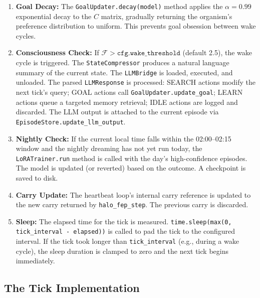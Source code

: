 \begin{enumerate}
    \item \textbf{Goal Decay:} The \texttt{GoalUpdater.decay(model)} method applies the $\alpha = 0.99$ exponential decay to the $C$ matrix, gradually returning the organism's preference distribution to uniform. This prevents goal obsession between wake cycles.

    \item \textbf{Consciousness Check:} If $\mathcal{F} > \texttt{cfg.wake\_threshold}$ (default 2.5), the wake cycle is triggered. The \texttt{StateCompressor} produces a natural language summary of the current state. The \texttt{LLMBridge} is loaded, executed, and unloaded. The parsed \texttt{LLMResponse} is processed: SEARCH actions modify the next tick's query; GOAL actions call \texttt{GoalUpdater.update\_goal}; LEARN actions queue a targeted memory retrieval; IDLE actions are logged and discarded. The LLM output is attached to the current episode via \texttt{EpisodeStore.update\_llm\_output}.

    \item \textbf{Nightly Check:} If the current local time falls within the 02:00--02:15 window and the nightly dreaming has not yet run today, the \texttt{LoRATrainer.run} method is called with the day's high-confidence episodes. The model is updated (or reverted) based on the outcome. A checkpoint is saved to disk.

    \item \textbf{Carry Update:} The heartbeat loop's internal carry reference is updated to the new carry returned by \texttt{halo\_fep\_step}. The previous carry is discarded.

    \item \textbf{Sleep:} The elapsed time for the tick is measured. \texttt{time.sleep(max(0, tick\_interval - elapsed))} is called to pad the tick to the configured interval. If the tick took longer than \texttt{tick\_interval} (e.g., during a wake cycle), the sleep duration is clamped to zero and the next tick begins immediately.
\end{enumerate}

\subsection{The Tick Implementation}

